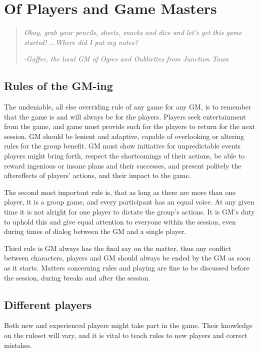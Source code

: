 \documentclass[11pt,a4paper,twocolumn]{book}
\begin{document}
    \chapter{Of Players and Game Masters}
    
     \begin{quote}
    \emph{Okay, grab your pencils, sheets, snacks and dice and let's get this game started! ...Where did I put my notes?}
    
    \emph{-Gaffer, the local GM of Ogres and Oubliettes from Junction Town}
    \end{quote}
    
    \section*{Rules of the GM-ing}
    The undeniable, all else overriding rule of any game for any GM, is to remember that the game is and will always be for the players. Players seek entertainment from the game, and game must provide such for the players to return for the next session. GM should be lenient and adaptive, capable of overlooking or altering rules for the group benefit. GM must show initiative for unpredictable events players might bring forth, respect the shortcomings of their actions, be able to reward ingenious or insane plans and their successes, and present politely the aftereffects of players' actions, and their impact to the game.
    
    The second most important rule is, that as long as there are more than one player, it is a group game, and every participant has an equal voice. At any given time it is not alright for one player to dictate the group's actions. It is GM's duty to uphold this and give equal attention to everyone within the session, even during times of dialog between the GM and a single player.
    
    Third rule is GM always has the final say on the matter, thus any conflict between characters, players and GM should always be ended by the GM as soon as it starts. Matters concerning rules and playing are fine to be discussed before the session, during breaks and after the session.
    
    \section*{Different players}
    Both new and experienced players might take part in the game. Their knowledge on the ruleset will vary, and it is vital to teach rules to new players and correct mistakes.
    
\end{document}
